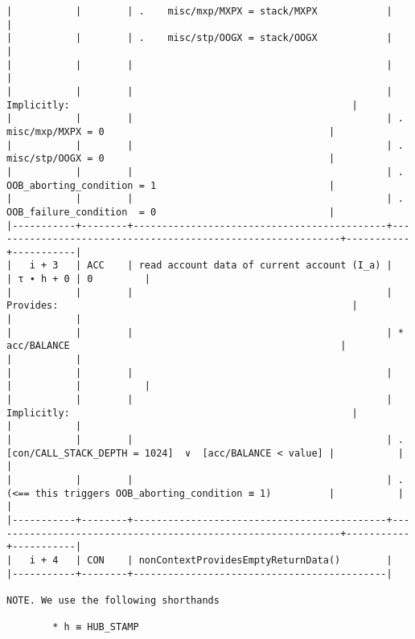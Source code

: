 \documentclass[varwidth=\maxdimen,margin=0.5cm,multi={verbatim}]{standalone}
\begin{document}
\begin{verbatim}
|           |        | .    misc/mxp/MXPX = stack/MXPX            |                                                             |
|           |        | .    misc/stp/OOGX = stack/OOGX            |                                                             |
|           |        |                                            |                                                             |
|           |        |                                            | Implicitly:                                                 |
|           |        |                                            | .   misc/mxp/MXPX = 0                                       |
|           |        |                                            | .   misc/stp/OOGX = 0                                       |
|           |        |                                            | .   OOB_aborting_condition = 1                              |
|           |        |                                            | .   OOB_failure_condition  = 0                              |
|-----------+--------+--------------------------------------------+-------------------------------------------------------------+-----------+-----------|
|   i + 3   | ACC    | read account data of current account (I_a) |                                                             | τ ∙ h + 0 | 0         |
|           |        |                                            | Provides:                                                   |           |           |
|           |        |                                            | * acc/BALANCE                                               |           |           |
|           |        |                                            |                                                             |           |           |
|           |        |                                            | Implicitly:                                                 |           |           |
|           |        |                                            | .   [con/CALL_STACK_DEPTH = 1024]  ∨  [acc/BALANCE < value] |           |           |
|           |        |                                            | .   (<== this triggers OOB_aborting_condition ≡ 1)          |           |           |
|-----------+--------+--------------------------------------------+-------------------------------------------------------------+-----------+-----------|
|   i + 4   | CON    | nonContextProvidesEmptyReturnData()        |
|-----------+--------+--------------------------------------------|

NOTE. We use the following shorthands

        * h ≡ HUB_STAMP


\end{verbatim}
\end{document}
